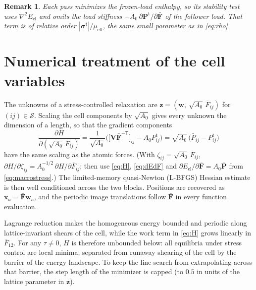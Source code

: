 \documentclass[11pt,a4paper]{article}
\newtheorem{remark}{Remark}
\newcommand{\Fb}{\bar{\mathbf F}}
\newcommand{\Pb}{\bar{\mathbf P}}
\newcommand{\Pt}{\mathbf P^{\mathrm t}}
\newcommand{\sigt}{\bm\sigma^{\mathrm t}}
\newcommand{\x}{\mathbf x}
\newcommand{\w}{\mathbf w}
\begin{document}
\begin{remark}
Each pass minimizes the frozen-load enthalpy, so its stability test uses
\(\nabla^2E_{\mathrm{el}}\) and omits the load stiffness \(-A_0\,\partial\Pt/\partial\Fb\) of the
follower load. That term is of relative order \(|\sigt|/\mu_{\mathrm{eff}}\), the same small
parameter as in \eqref{eq:rho}.
\end{remark}

\section{Numerical treatment of the cell variables}
\label{sec:numerics}

The unknowns of a stress-controlled relaxation are \(\mathbf z=(\w,\ \sqrt{A_0}\,\bar F_{ij})\)
for \((ij)\in\mathcal S\). Scaling the cell components by \(\sqrt{A_0}\) gives every unknown the
dimension of a length, so that the gradient components
\begin{equation}
  \frac{\partial H}{\partial(\sqrt{A_0}\,\bar F_{ij})}
  =\frac{1}{\sqrt{A_0}}\Big(\big[\mathbf V\Fb^{-\mathsf T}\big]_{ij}-A_0P^{\mathrm t}_{ij}\Big)
  =\sqrt{A_0}\,\big(\bar P_{ij}-P^{\mathrm t}_{ij}\big)
  \label{eq:gradz}
\end{equation}
have the same scaling as the atomic forces. (With \(\zeta_{ij}=\sqrt{A_0}\,\bar F_{ij}\),
\(\partial H/\partial\zeta_{ij}=A_0^{-1/2}\,\partial H/\partial\bar F_{ij}\); then use \eqref{eq:H},
\eqref{eq:dEdF} and \(\partial E_{\mathrm{el}}/\partial\Fb=A_0\Pb\) from \eqref{eq:macrostress}.) The
limited-memory quasi-Newton (L-BFGS) Hessian
estimate is then well conditioned across the two blocks. Positions are recovered as
\(\x_a=\Fb\w_a\), and the periodic image translations follow \(\Fb\) in every function evaluation.

Lagrange reduction makes the homogeneous energy bounded and periodic along lattice-invariant shears
of the cell, while the work term in \eqref{eq:H} grows linearly in \(\bar F_{12}\). For any
\(\tau\neq0\), \(H\) is therefore unbounded below: all equilibria under stress control are local
minima, separated from runaway shearing of the cell by the barrier of the energy landscape. To keep
the line search from extrapolating across that barrier, the step length of the minimizer is
capped (to \(0.5\) in units of the lattice parameter in \(\mathbf z\)).
\end{document}
